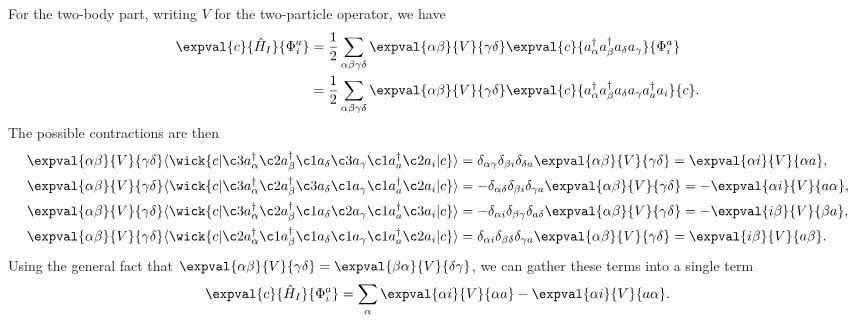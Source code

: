 \newpage

For the two-body part, writing $V$ for the two-particle operator, we have
\begin{align*}
    \expval{c}{\hat{H}_I}{\Phi_i^a} &= \frac{1}{2} \sum_{\alpha\beta\gamma\delta} \expval{\alpha\beta}{V}{\gamma\delta} \expval{c}{a_\alpha^\dagger a_\beta^\dagger a_\delta a_\gamma}{\Phi_i^a} \\
    &= \frac{1}{2} \sum_{\alpha\beta\gamma\delta} \expval{\alpha\beta}{V}{\gamma\delta} \expval{c}{a_\alpha^\dagger a_\beta^\dagger a_\delta a_\gamma a_a^\dagger a_i}{c}.
\end{align*}
The possible contractions are then
\begin{align*}
    \expval{\alpha\beta}{V}{\gamma\delta} \langle
    \wick{
        c
        \vert
        \c3 a_\alpha^\dagger \c2 a_\beta^\dagger \c1 a_\delta \c3 a_\gamma \c1 a_a^\dagger \c2 a_i
        \vert
        c
    }
    \rangle
    &= \delta_{\alpha \gamma} \delta_{\beta i} \delta_{\delta a} \expval{\alpha\beta}{V}{\gamma\delta}
    = \expval{\alpha i}{V}{\alpha a}, \\
    \expval{\alpha\beta}{V}{\gamma\delta} \langle
    \wick{
        c
        \vert
        \c3 a_\alpha^\dagger \c2 a_\beta^\dagger \c3 a_\delta \c1 a_\gamma \c1 a_a^\dagger \c2 a_i
        \vert
        c
    }
    \rangle
    &= -\delta_{\alpha \delta} \delta_{\beta i} \delta_{\gamma a} \expval{\alpha\beta}{V}{\gamma\delta} = -\expval{\alpha i}{V}{a \alpha}, \\
    \expval{\alpha\beta}{V}{\gamma\delta} \langle
    \wick{
        c
        \vert
        \c3 a_\alpha^\dagger \c2 a_\beta^\dagger \c1 a_\delta \c2 a_\gamma \c1 a_a^\dagger \c3 a_i
        \vert
        c
    }
    \rangle
    &= -\delta_{\alpha i} \delta_{\beta \gamma} \delta_{a \delta} \expval{\alpha\beta}{V}{\gamma\delta} = -\expval{i \beta}{V}{\beta a}, \\
    \expval{\alpha\beta}{V}{\gamma\delta} \langle
    \wick{
        c
        \vert
        \c2 a_\alpha^\dagger \c1 a_\beta^\dagger \c1 a_\delta \c1 a_\gamma \c1 a_a^\dagger \c2 a_i
        \vert
        c
    }
    \rangle
    &= \delta_{\alpha i} \delta_{\beta \delta} \delta_{\gamma a} \expval{\alpha\beta}{V}{\gamma\delta} = \expval{i \beta}{V}{a \beta}.
\end{align*}
Using the general fact that $\expval{\alpha \beta}{V}{\gamma \delta} = \expval{\beta \alpha}{V}{\delta \gamma}$, we can gather these terms into a single term
\begin{equation*}
    \expval{c}{\hat{H}_I}{\Phi_i^a} = \sum_{\alpha} \expval{\alpha i}{V}{\alpha a} - \expval{\alpha i}{V}{a \alpha}.
\end{equation*}

